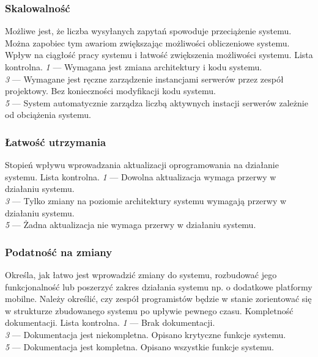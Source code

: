 \documentclass[10pt]{dokument-ppi}
\begin{document}
\subsubsection{Skalowalność}
\begin{requirement}
    \desc%
        Możliwe jest, że liczba wysyłanych zapytań spowoduje przeciążenie
        systemu. Można zapobiec tym awariom zwiększając możliwości obliczeniowe
        systemu.
    \metric%
        Wpływ na ciągłość pracy systemu i łatwość zwiększenia możliwości
        systemu.
    \tool%
        Lista kontrolna.
    \scale%
        \emph{1} --- Wymagana jest zmiana architektury i kodu systemu.\\
        \emph{3} --- Wymagane jest ręczne zarządzenie instancjami serwerów przez zespół projektowy. Bez konieczności modyfikacji kodu systemu.\\
        \emph{5} --- System automatycznie zarządza liczbą aktywnych instacji serwerów zależnie od obciążenia systemu.
\end{requirement}

\subsubsection{Łatwość utrzymania}
\begin{requirement}
    \metric*%
        Stopień wpływu wprowadzania aktualizacji oprogramowania na działanie
        systemu.
    \tool%
        Lista kontrolna.
    \scale%
        \emph{1} --- Dowolna aktualizacja wymaga przerwy w działaniu systemu.\\
        \emph{3} --- Tylko zmiany na poziomie architektury systemu wymagają przerwy w działaniu systemu.\\
        \emph{5} --- Żadna aktualizacja nie wymaga przerwy w działaniu systemu.
\end{requirement}

\subsubsection{Podatność na zmiany}
\begin{requirement}
    \desc%
        Określa, jak łatwo jest wprowadzić zmiany do systemu, rozbudować jego
        funkcjonalność lub poszerzyć zakres działania systemu np. o dodatkowe
        platformy mobilne. Należy określić, czy zespół programistów będzie w
        stanie zorientować się w strukturze zbudowanego systemu po upływie
        pewnego czasu.
    \metric%
        Kompletność dokumentacji.
    \tool%
        Lista kontrolna.
    \scale%
        \emph{1} --- Brak dokumentacji.\\
        \emph{3} --- Dokumentacja jest niekompletna. Opisano krytyczne funkcje systemu.\\
        \emph{5} --- Dokumentacja jest kompletna. Opisano wszystkie funkcje systemu.
\end{requirement}
\end{document}
